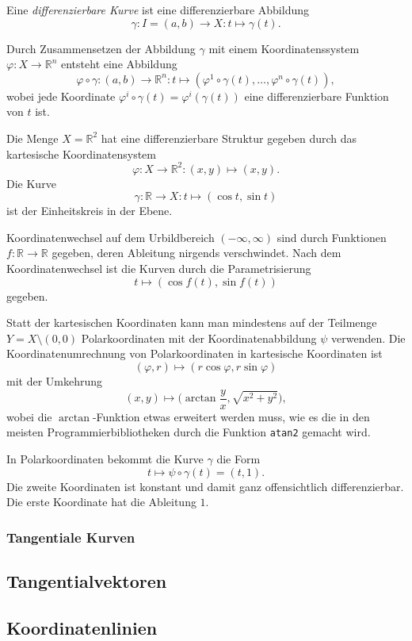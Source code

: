 \begin{definition}
Eine {\em differenzierbare Kurve}
%
%
ist eine differenzierbare Abbildung
\[
\gamma
\colon
I = (a,b) \to X
:
t \mapsto \gamma(t).
\]
\end{definition}

Durch Zusammensetzen der Abbildung $\gamma$ mit einem Koordinatenssystem
$\varphi\colon X\to \mathbb{R}^n$ entsteht eine Abbildung 
\[
\varphi\circ\gamma
\colon
(a,b) \to \mathbb{R}^n
:
t \mapsto (\varphi^1\circ \gamma(t),\dots,\varphi^n\circ\gamma(t)),
\]
wobei jede Koordinate $\varphi^i\circ\gamma(t) = \varphi^i(\gamma(t))$
eine differenzierbare Funktion von $t$ ist.



\begin{beispiel}
Die Menge $X=\mathbb{R}^2$ hat eine differenzierbare Struktur gegeben durch
das kartesische Koordinatensystem
\[
\varphi
\colon
X\to\mathbb{R}^2
:
(x,y)\mapsto (x,y).
\]
Die Kurve 
\[
\gamma
\colon
\mathbb{R}\to X
:
t\mapsto (\cos t, \sin t)
\]
ist der Einheitskreis in der Ebene.

Koordinatenwechsel auf dem Urbildbereich $(-\infty,\infty)$ sind durch
Funktionen $f\colon\mathbb{R}\to\mathbb{R}$ gegeben, deren Ableitung
nirgends verschwindet.
Nach dem Koordinatenwechsel ist die Kurven durch die Parametrisierung
\[
t \mapsto (\cos f(t),\sin f(t))
\]
gegeben.

Statt der kartesischen Koordinaten kann man mindestens auf der Teilmenge
$Y=X\setminus (0,0)$ Polarkoordinaten mit der Koordinatenabbildung $\psi$
verwenden.
Die Koordinatenumrechnung von Polarkoordinaten in kartesische Koordinaten
ist
\[
(\varphi, r) \mapsto (r\cos\varphi,r\sin\varphi)
\]
mit der Umkehrung
\[
(x,y) \mapsto \bigl(\arctan\frac{y}{x},\sqrt{x^2+y^2}\bigr),
\]
wobei die $\arctan$-Funktion etwas erweitert werden muss, wie es die
in den meisten Programmierbibliotheken durch die Funktion \texttt{atan2}
gemacht wird.

In Polarkoordinaten bekommt die Kurve $\gamma$ die Form
\[
t\mapsto \psi\circ\gamma(t)
=
(t, 1).
\]
Die zweite Koordinaten ist konstant und damit ganz offensichtlich 
differenzierbar.
Die erste Koordinate hat die Ableitung $1$.
\end{beispiel}

\subsubsection{Tangentiale Kurven}

%
%
\subsection{Tangentialvektoren}

%
%
\subsection{Koordinatenlinien}



